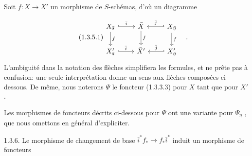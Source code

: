 Soit $f : X \longrightarrow X'$ un morphisme de $S$-schémas, d'où un diagramme

\begin{equation}\tag{1.3.5.1}
\begin{tikzcd}
X_{\bar s} \arrow[r, hook, "\bar i"] \arrow[d, "f"] & \bar X \arrow[d, "f"] & X_{\bar \eta} \arrow[l, hook', "\bar j"'] \arrow[d, "f"] \\
X'_{\bar s} \arrow[r, hook, "\bar i"] & \bar X' & X'_{\bar \eta} \arrow[l, hook', "\bar j"']
\end{tikzcd}\quad .
\end{equation}
L'ambiguité dans la notation des flèches simplifiera les formules, et ne prête pas à confusion: une seule interprétation donne un sens aux flèches composées ci-dessous. De même, nous noterons $\Psi$ le foncteur (1.3.3.3) pour $X$ tant que pour $X'$ .

Les morphismes de foncteurs décrits ci-dessous pour $\Psi$ ont une variante pour $\Psi_\eta$ , que nous omettons en général d'expliciter.



1.3.6. Le morphisme de changement de base $\bar{i}^* f_* \longrightarrow f_* \bar{i}^*$ induit un morphisme de foncteurs

